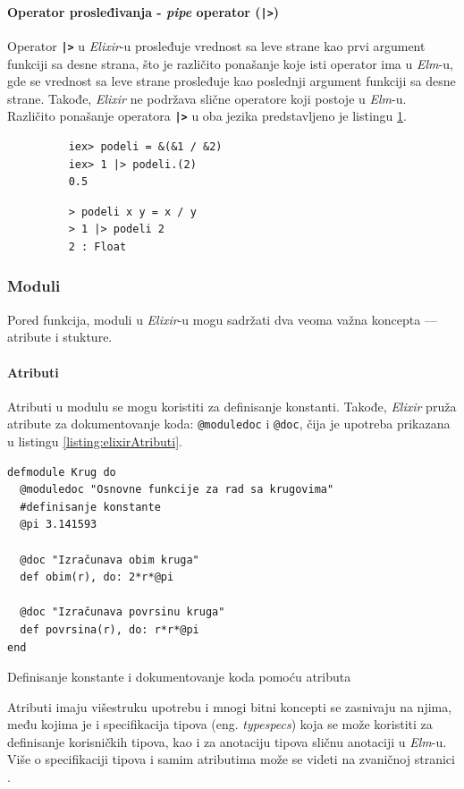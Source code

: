 \documentclass[12pt,oneside]{memoir}
\begin{document}
\paragraph{Operator prosleđivanja - \emph{pipe} operator (\texttt{\textbf{|>}})}
Operator \texttt{\textbf{|>}} u \emph{Elixir}-u prosleđuje vrednost sa leve strane kao prvi argument
funkciji sa desne strana, što je različito ponašanje koje isti operator ima u \emph{Elm}-u, gde se
vrednost sa leve strane prosleđuje kao poslednji argument funkciji sa desne
strane. Takođe, \emph{Elixir} ne podržava slične operatore koji postoje u \emph{Elm}-u. Različito ponašanje
operatora \texttt{\textbf{|>}} u oba jezika predstavljeno je listingu \ref{listing:elixirPipe}.
\begin{figure}[!h]
\begin{minipage}{0.5\textwidth}
  \centering
  \begin{verbatim}
    iex> podeli = &(&1 / &2)
    iex> 1 |> podeli.(2)
    0.5
  \end{verbatim}
\end{minipage}
\begin{minipage}{0.5\textwidth}
  \centering
  \begin{verbatim}
    > podeli x y = x / y
    > 1 |> podeli 2
    2 : Float
  \end{verbatim}
\end{minipage}
\label{listing:elixirPipe}
\end{figure}
\subsubsection{Moduli}
Pored funkcija, moduli u \emph{Elixir}-u mogu sadržati dva veoma važna koncepta --- atribute i
stukture.
\paragraph{Atributi}
Atributi u modulu se mogu koristiti za definisanje konstanti. Takođe, \emph{Elixir} pruža atribute
za dokumentovanje koda: \texttt{@moduledoc} i \texttt{@doc}, čija je upotreba prikazana u
listingu \ref{listing:elixirAtributi}.
\begin{listing}[!h]
\begin{verbatim}
defmodule Krug do
  @moduledoc "Osnovne funkcije za rad sa krugovima"
  #definisanje konstante
  @pi 3.141593 

  @doc "Izračunava obim kruga"
  def obim(r), do: 2*r*@pi

  @doc "Izračunava povrsinu kruga"
  def povrsina(r), do: r*r*@pi
end
\end{verbatim}
\caption{Definisanje konstante i dokumentovanje koda pomoću atributa}
\label{listing:elixirAtributi}
\end{listing}
Atributi imaju višestruku upotrebu i mnogi bitni koncepti se zasnivaju na njima, među kojima
je i specifikacija tipova (eng. \emph{typespecs}) koja se može koristiti za definisanje
korisničkih tipova, kao i za anotaciju tipova sličnu anotaciji u \emph{Elm}-u. Više o specifikaciji
tipova i samim atributima može se videti na zvaničnoj stranici \cite{elixir}.
\end{document}
